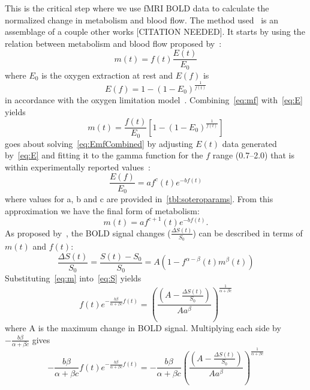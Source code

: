     This is the critical step where we use fMRI BOLD data to calculate the normalized change in metabolism and blood flow.  The method used~\citep{sotero2011} is an assemblage of a couple other works [CITATION NEEDED]. It starts by using the relation between metabolism and blood flow proposed by~\citet{buxton2004}:
    \begin{equation} \label{eq:mf}
      m(t)=f(t)\frac{E(t)}{E_0}
    \end{equation}
  where $E_0$ is the oxygen extraction at rest and $E(f)$ is
    \begin{equation} \label{eq:E}
      E(f)=1-(1-E_0)^{\frac{1}{f(t)}}
    \end{equation}
  in accordance with the oxygen limitation model~\citep{buxton1997}.  Combining~\cref{eq:mf} with~\cref{eq:E} yields
    \begin{equation} \label{eq:EmfCombined}
      m(t)=\frac{f(t)}{E_0}\left[1-(1-E_0)^{\frac{1}{f(t)}}\right]
    \end{equation}
   goes about solving~\cref{eq:EmfCombined} by adjusting $E(t)$ data generated by~\cref{eq:E} and fitting it to the gamma function for the $f$ range (0.7--2.0) that is within experimentally reported values~\citep{fox1988,leithner2009,lin2010}:
    \begin{equation} \label{eq:gammafct}
      \frac{E(f)}{E_0}=af^{c}(t)e^{-bf(t)}
    \end{equation}
  where values for a, b and c are provided in~\cref{tbl:soteroparams}.  From this approximation we have the final form of metabolism:
    \begin{equation} \label{eq:m} 
      m(t)=af^{c+1}(t)e^{-bf(t)}.
    \end{equation}
  As proposed by~\citet{davis1998}, the BOLD signal changes ($\frac{\Delta S(t)}{S_0}$) can be described in terms of $m(t)$ and $f(t)$:
    \begin{equation} \label{eq:S}
      \frac{\Delta S(t)}{S_0} = \frac{S(t)-S_0}{S_0} = A(1-f^{\alpha-\beta}(t) m^\beta(t))
    \end{equation}
  Substituting~\cref{eq:m} into~\cref{eq:S} yields
    \begin{equation} \label{eq:mAndS}
      f(t)e^{-\frac{b \beta}{\alpha + \beta c}f(t)}=\left(\frac{\left(A-\frac{\Delta S(t)}{S_0}\right)}{A a^\beta}\right)^{\frac{1}{\alpha+\beta c}}
    \end{equation}
  where A is the maximum change in BOLD signal.  Multiplying each side by $-\frac{b\beta}{\alpha+\beta c}$ gives
    \begin{equation} \label{eq:mAndSmultiplied}
      -\frac{b\beta}{\alpha+\beta c} f(t)e^{-\frac{b \beta}{\alpha + \beta c}f(t)}=-\frac{b\beta}{\alpha+\beta c} \left(\frac{\left(A-\frac{\Delta S(t)}{S_0}\right)}{A a^\beta}\right)^{\frac{1}{\alpha+\beta c}}
    \end{equation}
